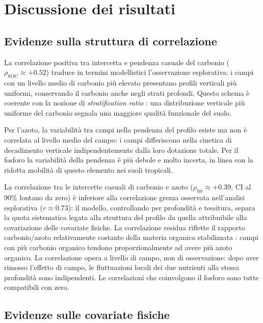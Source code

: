 \documentclass[11pt, a4paper]{article}
\begin{document}
\section{Discussione dei risultati}
\label{sec:discussione}

\subsection{Evidenze sulla struttura di correlazione}

La correlazione positiva tra intercetta e pendenza casuale del carbonio
($\rho_{\mathrm{SOC}} \approx +0.52$) traduce in termini modellistici
l'osservazione esplorativa: i campi con un livello medio di carbonio più
elevato presentano profili verticali più uniformi, conservando il carbonio
anche negli strati profondi. Questo schema è coerente con la nozione di
\emph{stratification ratio} \citep{franzluebbers2002}: una distribuzione
verticale più uniforme del carbonio segnala una maggiore qualità funzionale
del suolo.

Per l'azoto, la variabilità tra campi nella pendenza del profilo esiste ma
non è correlata al livello medio del campo: i campi differiscono nella
cinetica di decadimento verticale indipendentemente dalla loro dotazione
totale. Per il fosforo la variabilità della pendenza è più debole e molto
incerta, in linea con la ridotta mobilità di questo elemento nei suoli tropicali.

La correlazione tra le intercette casuali di carbonio e azoto
($\rho_{\mathrm{int}} \approx +0.39$, CI al 90\% lontano da zero) è
inferiore alla correlazione grezza osservata nell'analisi esplorativa ($r \approx 0.73$):
il modello, controllando per profondità e tessitura, separa la quota
sistematica legata alla struttura del profilo da quella attribuibile alla
covariazione delle covariate fisiche.
La correlazione residua riflette il rapporto carbonio/azoto relativamente
costante della materia organica stabilizzata \citep{cleveland2007}: campi con
più carbonio organico tendono proporzionalmente ad avere più azoto organico.
La correlazione opera a livello di campo, non di osservazione: dopo aver
rimosso l'effetto di campo, le fluttuazioni locali dei due nutrienti alla
stessa profondità sono indipendenti. Le correlazioni che coinvolgono il
fosforo sono tutte compatibili con zero.

\subsection{Evidenze sulle covariate fisiche}
\end{document}
